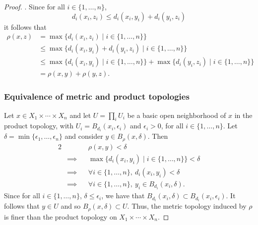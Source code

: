 \begin{solution}
\begin{proof}
    . Since for all $i \in \{1, \ldots, n\}$,
    \begin{equation*}
      d_i(x_i, z_i) \leq d_i(x_i, y_i) + d_i(y_i, z_i)
    \end{equation*}
    it follows that
    \begin{align*}
      \rho(x, z)  &= \max\{ d_i(x_i, z_i) \mid i \in \{1, \ldots, n\} \} \\
                  &\leq \max\{ d_i(x_i, y_i) + d_i(y_i, z_i) \mid i \in \{1, \ldots, n\} \} \\
                  &\leq \max\{ d_i(x_i, y_i) \mid i \in \{1, \ldots, n\} \} + \max\{ d_i(y_i, z_i) \mid i \in \{1, \ldots, n\} \} \\
                  &= \rho(x, y) + \rho(y, z).
    \end{align*}

    \subsubsection*{Equivalence of metric and product topologies}
    Let $x \in X_1 \times \cdots \times X_n$ and let $U = \prod_i U_i$ be a basic open neighborhood of $x$ in the product topology, with $U_i = B_{d_i}(x_i, \epsilon_i)$ and $\epsilon_i > 0$, for all $i \in \{1, \ldots, n\}$.
    Let $\delta = \min\{\epsilon_1, \ldots, \epsilon_n\}$ and consider $y \in B_\rho(x, \delta)$.
    Then
    \begin{alignat*}{2}
      &           && \rho(x, y) < \delta \\
      & \implies  && \max\{ d_i(x_i, y_i) \mid i \in \{1, \ldots, n\} \} < \delta \\
      & \implies  && \forall i \in \{1, \ldots, n\},~ d_i(x_i, y_i) < \delta \\
      & \implies  && \forall i \in \{1, \ldots, n\},~ y_i \in B_{d_i}(x_i, \delta).
    \end{alignat*}
    Since for all $i \in \{1, \ldots, n\}$, $\delta \leq \epsilon_i$, we have that $B_{d_i}(x_i, \delta) \subset B_{d_i}(x_i, \epsilon_i)$.
    It follows that $y \in U$ and so $B_\rho(x, \delta) \subset U$.
    Thus, the metric topology induced by $\rho$ is finer than the product topology on $X_1 \times \cdots \times X_n$.


\end{proof}
\end{solution}
